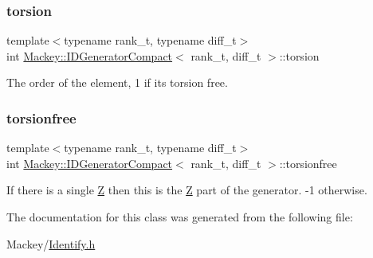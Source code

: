 \subsubsection{\texorpdfstring{torsion}{torsion}}
{\footnotesize\ttfamily template$<$typename rank\+\_\+t, typename diff\+\_\+t$>$ \\
int \hyperlink{classMackey_1_1IDGeneratorCompact}{Mackey\+::\+I\+D\+Generator\+Compact}$<$ rank\+\_\+t, diff\+\_\+t $>$\+::torsion}



The order of the element, 1 if it\textquotesingle{}s torsion free. 

\mbox{\label{classMackey_1_1IDGeneratorCompact_a986a1a67d8f8455cafc2aeeb2e45203e}} 
\subsubsection{\texorpdfstring{torsionfree}{torsionfree}}
{\footnotesize\ttfamily template$<$typename rank\+\_\+t, typename diff\+\_\+t$>$ \\
int \hyperlink{classMackey_1_1IDGeneratorCompact}{Mackey\+::\+I\+D\+Generator\+Compact}$<$ rank\+\_\+t, diff\+\_\+t $>$\+::torsionfree}



If there is a single \hyperlink{classZ}{Z} then this is the \hyperlink{classZ}{Z} part of the generator. -\/1 otherwise. 



The documentation for this class was generated from the following file\+:\begin{DoxyCompactItemize}
\item 
Mackey/\hyperlink{Identify_8h}{Identify.\+h}\end{DoxyCompactItemize}
